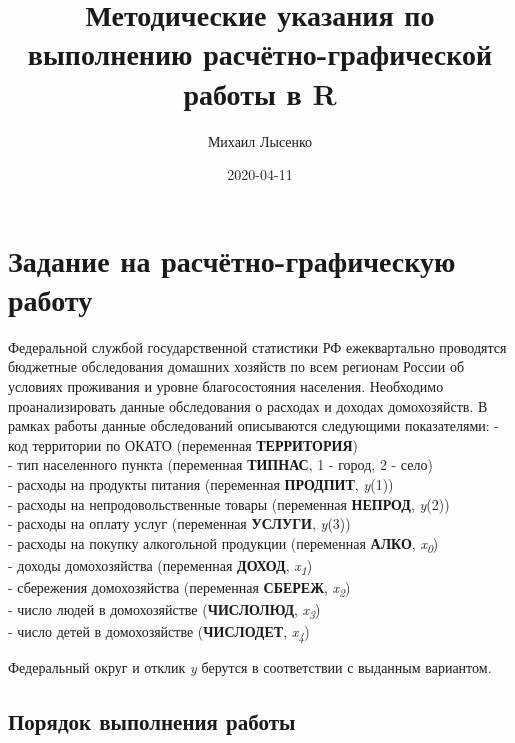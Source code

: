 \documentclass[
]{book}
\title{Методические указания по выполнению расчётно-графической работы в R}
\author{Михаил Лысенко}
\date{2020-04-11}
\begin{document}
\maketitle

{
\setcounter{tocdepth}{1}
\tableofcontents
}
\hypertarget{ux437ux430ux434ux430ux43dux438ux435-ux43dux430-ux440ux430ux441ux447ux451ux442ux43dux43e-ux433ux440ux430ux444ux438ux447ux435ux441ux43aux443ux44e-ux440ux430ux431ux43eux442ux443}{%
\chapter{Задание на расчётно-графическую работу}\label{ux437ux430ux434ux430ux43dux438ux435-ux43dux430-ux440ux430ux441ux447ux451ux442ux43dux43e-ux433ux440ux430ux444ux438ux447ux435ux441ux43aux443ux44e-ux440ux430ux431ux43eux442ux443}}

Федеральной службой государственной статистики РФ ежеквартально проводятся бюджетные обследования домашних хозяйств по всем регионам России об условиях проживания и уровне благосостояния населения. Необходимо проанализировать данные обследования о расходах и доходах домохозяйств.
В рамках работы данные обследований описываются следующими показателями:
- код территории по ОКАТО (переменная \textbf{ТЕРРИТОРИЯ})\\
- тип населенного пункта (переменная \textbf{ТИПНАС}, 1 - город, 2 - село)\\
- расходы на продукты питания (переменная \textbf{ПРОДПИТ}, \emph{y}(1))\\
- расходы на непродовольственные товары (переменная \textbf{НЕПРОД}, \emph{y}(2))\\
- расходы на оплату услуг (переменная \textbf{УСЛУГИ}, \emph{y}(3))\\
- расходы на покупку алкогольной продукции (переменная \textbf{АЛКО}, \emph{x}\textsubscript{\emph{0}})\\
- доходы домохозяйства (переменная \textbf{ДОХОД}, \emph{x}\textsubscript{\emph{1}})\\
- сбережения домохозяйства (переменная \textbf{СБЕРЕЖ}, \emph{x}\textsubscript{\emph{2}})\\
- число людей в домохозяйстве (\textbf{ЧИСЛОЛЮД}, \emph{x}\textsubscript{\emph{3}})\\
- число детей в домохозяйстве (\textbf{ЧИСЛОДЕТ}, \emph{x}\textsubscript{\emph{4}})

Федеральный округ и отклик \emph{y} берутся в соответствии с выданным вариантом.

\hypertarget{ux43fux43eux440ux44fux434ux43eux43a-ux432ux44bux43fux43eux43bux43dux435ux43dux438ux44f-ux440ux430ux431ux43eux442ux44b}{%
\section{Порядок выполнения работы}\label{ux43fux43eux440ux44fux434ux43eux43a-ux432ux44bux43fux43eux43bux43dux435ux43dux438ux44f-ux440ux430ux431ux43eux442ux44b}}
\end{document}
